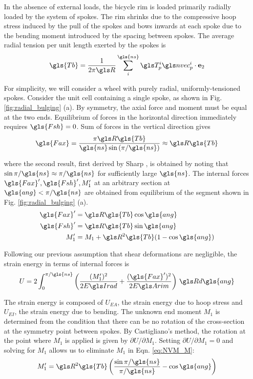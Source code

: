 \documentclass[\rootdir/thesis.tex]{subfiles}
\begin{document}
In the absence of external loads, the bicycle rim is loaded primarily radially loaded by the system of spokes. The rim shrinks due to the compressive hoop stress induced by the pull of the spokes and bows inwards at each spoke due to the bending moment introduced by the spacing between spokes. The average radial tension per unit length exerted by the spokes is
\begin{equation}
\label{eq:Tbar}
\gls{Tb} = \frac{1}{2\pi \R} \sum_i^{\gls{ns}} \T_p^i \n_p^i \cdot\et
\end{equation}

For simplicity, we will consider a wheel with purely radial, uniformly-tensioned spokes. Consider the unit cell containing a single spoke, as shown in Fig. \ref{fig:radial_bulging} (a). By symmetry, the axial force and moment must be equal at the two ends. Equilibrium of forces in the horizontal direction immediately requires $\gls{Fsh}=0$. Sum of forces in the vertical direction gives
\begin{equation}
\label{eq:Nr}
\gls{Fax} = \frac{\pi \R\gls{Tb}}{\gls{ns}\sin{(\pi/\gls{ns})}} \approx \R\gls{Tb}
\end{equation}

where the second result, first derived by Sharp \cite{Sharp1977}, is obtained by noting that $\sin{\pi/\gls{ns}}\approx \pi/\gls{ns}$ for sufficiently large $\gls{ns}$. The internal forces $\gls{Fax}',\gls{Fsh}',M_1'$ at an arbitrary section at $\gls{ang} < \pi/\gls{ns}$ are obtained from equilibrium of the segment shown in Fig. \ref{fig:radial_bulging} (a).
\begin{subequations}
\begin{align}
\gls{Fax}' &= \R\gls{Tb}\cos{\gls{ang}}\\
\gls{Fsh}' &= \R\gls{Tb}\sin{\gls{ang}}\\
M_1'       &= M_1 + \R^2\gls{Tb}(1-\cos{\gls{ang}})\label{eq:NVM_M}
\end{align}
\end{subequations}

Following our previous assumption that shear deformations are negligible, the strain energy in terms of internal forces is
\begin{equation}
U = 2\int_0^{\pi/\gls{ns}} \left(\frac{(M_1')^2}{2\EIr} + \frac{(\gls{Fax}')^2}{2\EA}\right)\, \R d\gls{ang}
\end{equation}

The strain energy is composed of $U_{EA}$, the strain energy due to hoop stress and $U_{EI}$, the strain energy due to bending. The unknown end moment $M_1$ is determined from the condition that there can be no rotation of the cross-section at the symmetry point between spokes. By Castigliano's method, the rotation at the point where $M_1$ is applied is given by $\partial U/\partial M_1$. Setting $\partial U/\partial M_1=0$ and solving for $M_1$ allows us to eliminate $M_1$ in Eqn. \eqref{eq:NVM_M}:
\begin{equation}
M_1' = \R^2\gls{Tb} \left( \frac{\sin{\pi/\gls{ns}}}{\pi/\gls{ns}} - \cos{\gls{ang}} \right)
\end{equation}
\end{document}
